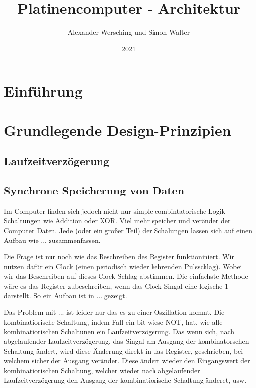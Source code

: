 \documentclass{scrartcl}
\begin{document}
    \title{Platinencomputer - Architektur}
    \author{Alexander Wersching und Simon Walter}
    \date{2021}
    \maketitle

    \newpage
    \tableofcontents
    \newpage

    \section{Einführung}

    \section{Grundlegende Design-Prinzipien}
    
    \subsection{Laufzeitverzögerung}
    
    \subsection{Synchrone Speicherung von Daten}

    Im Computer finden sich jedoch nicht nur simple combintatorische Logik-Schaltungen wie Addition oder XOR. Viel mehr speicher und veränder der Computer Daten. Jede (oder ein großer Teil) der Schalungen lassen sich auf einen Aufbau wie ... zusammenfassen.

    Die Frage ist nur noch wie das Beschreiben des Register funktioniniert. Wir nutzen dafür ein Clock (einen periodisch wieder kehrenden Pulsschlag). Wobei wir das Beschreiben auf dieses Clock-Schlag abstimmen. Die einfachste Methode wäre es das Register zubeschreiben, wenn das Clock-Singal eine logische $1$ darstellt. So ein Aufbau ist in ... gezeigt.

    Das Problem mit ... ist leider nur das es zu einer Oszillation kommt. Die kombinatiorische Schaltung, indem Fall ein bit-wiese NOT, hat, wie alle kombinatiorischen Schaltunen ein Laufzeitverzögerung. Das wenn sich, nach abgelaufender Laufzeitverzögerung, das Singal am Ausgang der kombinatorschen Schaltung ändert, wird diese Änderung direkt in das Register, geschrieben, bei welchem sicher der Ausgang veränder. Diese ändert wieder den Eingangswert der kombinatiorischen Schaltung, welcher wieder nach abgelaufender Laufzeitverzögerung den Ausgang der kombinatiorische Schaltung änderet, usw. 
    
\end{document}
